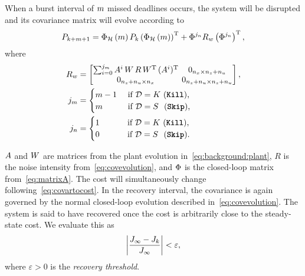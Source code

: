 When a burst interval of $m$ missed deadlines occurs, the system will be disrupted and its covariance matrix will evolve according to
%
\begin{equation}
\label{eq:covariance-evolution}
    P_{k+\nummisses+1} = \clmat{}_{\strat}\funof{m} P_k \left( \clmat{}_{\strat}\funof{m} \right)^\T + \clmat{}^{j_{\numhits}} R_w \left( \clmat{}^{j_{\numhits}} \right)^\T,
\end{equation}
where
\begin{equation}
\label{eq:evolutionparameters}
\setlength\arraycolsep{2pt}
    \begin{aligned}
        R_w &= 
        \begin{bmatrix} 
            \sum_{i=0}^{j_{\nummisses}} \Ap^i\,\Wp\,R\,\Wp^\T\,(\Ap^i)^\T & 0_{n_x \times n_z+n_u} \\ 
            0_{n_z + n_u \times n_x}               & 0_{n_z + n_u \times n_z+ n_u}
        \end{bmatrix}, \\
        j_{\nummisses} &= 
        \begin{cases} 
            \nummisses - 1 & \text{ if } \dstrat = K\,\, \text{(\tK{}),} \\ 
            \nummisses & \text{ if } \dstrat = S\,\,\,\, \text{(\tS{}),} 
        \end{cases} \\
        j_{\numhits} &= 
        \begin{cases} 
            1 \phantom{||222} & \text{ if } \dstrat = K\,\, \text{(\tK{}),} \\ 
            0 & \text{ if } \dstrat = S\,\,\,\, \text{(\tS{}).}
        \end{cases}
        \end{aligned}
\end{equation}

$A$ and $W$ are matrices from the plant evolution in~\eqref{eq:background:plant}, $R$ is the noise intensity from~\eqref{eq:covevolution}, and $\Phi{}$ is the closed-loop matrix from~\eqref{eq:matrixA}.
The cost will simultaneously change following~\eqref{eq:covartocost}.
In the recovery interval, the covariance is again governed by the normal closed-loop evolution described in~\eqref{eq:covevolution}.
The system is said to have recovered once the cost is arbitrarily close to the steady-state cost.
We evaluate this as
%
\begin{equation}
    \label{eq:cost-threshold}
    \abs{\frac{J_{\infty}-J_k}{J_\infty}} < \varepsilon,
\end{equation}
where $\varepsilon> 0$ is the \emph{recovery threshold}.

